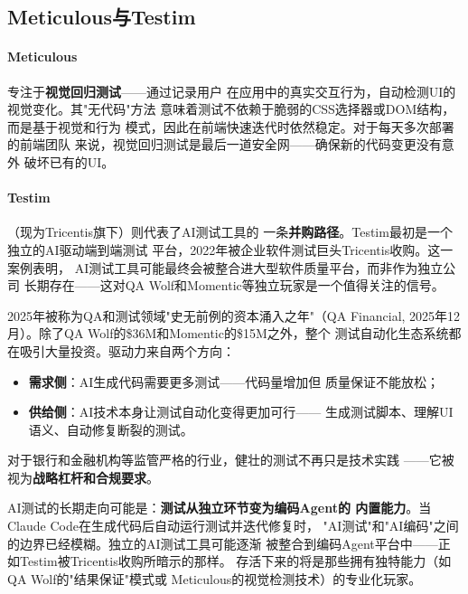 \subsection{Meticulous与Testim}
\label{subsec:meticulous-testim}

\paragraph{Meticulous}专注于\textbf{视觉回归测试}——通过记录用户
在应用中的真实交互行为，自动检测UI的视觉变化。其"无代码"方法
意味着测试不依赖于脆弱的CSS选择器或DOM结构，而是基于视觉和行为
模式，因此在前端快速迭代时依然稳定。对于每天多次部署的前端团队
来说，视觉回归测试是最后一道安全网——确保新的代码变更没有意外
破坏已有的UI。

\paragraph{Testim}（现为Tricentis旗下）则代表了AI测试工具的
一条\textbf{并购路径}。Testim最初是一个独立的AI驱动端到端测试
平台，2022年被企业软件测试巨头Tricentis收购。这一案例表明，
AI测试工具可能最终会被整合进大型软件质量平台，而非作为独立公司
长期存在——这对QA Wolf和Momentic等独立玩家是一个值得关注的信号。

\begin{corebox}[AI测试赛道的投资热潮与未来走向]
2025年被称为QA和测试领域"史无前例的资本涌入之年"（QA Financial,
2025年12月）。除了QA Wolf的\$36M和Momentic的\$15M之外，整个
测试自动化生态系统都在吸引大量投资。驱动力来自两个方向：
\begin{itemize}
  \item \textbf{需求侧}：AI生成代码需要更多测试——代码量增加但
    质量保证不能放松；
  \item \textbf{供给侧}：AI技术本身让测试自动化变得更加可行——
    生成测试脚本、理解UI语义、自动修复断裂的测试。
\end{itemize}
对于银行和金融机构等监管严格的行业，健壮的测试不再只是技术实践
——它被视为\textbf{战略杠杆和合规要求}。

AI测试的长期走向可能是：\textbf{测试从独立环节变为编码Agent的
内置能力}。当Claude Code在生成代码后自动运行测试并迭代修复时，
"AI测试"和"AI编码"之间的边界已经模糊。独立的AI测试工具可能逐渐
被整合到编码Agent平台中——正如Testim被Tricentis收购所暗示的那样。
存活下来的将是那些拥有独特能力（如QA Wolf的"结果保证"模式或
Meticulous的视觉检测技术）的专业化玩家。
\end{corebox}

